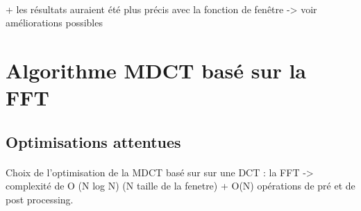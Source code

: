 \documentclass{article}
\begin{document}

    \paragraph{}%
    + les résultats auraient été plus précis avec la fonction de fenêtre -> voir améliorations possibles


    \newpage
    \section{Algorithme MDCT basé sur la FFT}
    \subsection{Optimisations attentues}



    \paragraph{}
    Choix de l'optimisation de la MDCT basé sur sur une DCT : la FFT -> complexité de O (N log N) (N taille de la fenetre) + O(N) opérations de pré et de post processing.
\end{document}
